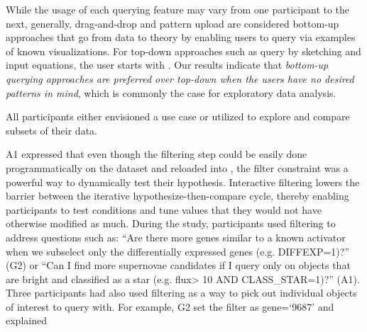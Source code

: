 \par While the usage of each querying feature may vary from one participant to the next, generally,  drag-and-drop and pattern upload are considered bottom-up approaches that go from data to theory by enabling users to query via examples of known visualizations. For top-down approaches such as query by sketching and input equations, the user starts with . Our results indicate that \emph{bottom-up querying approaches are preferred over top-down when the users have no desired patterns in mind}, which is commonly the case for exploratory data analysis.
\par All participants either envisioned a use case or utilized  to explore and compare subsets of their data. 
\par A1 expressed that even though the filtering step could be easily done programmatically on the dataset and reloaded into \zv, the filter constraint was a powerful way to dynamically test their hypothesis. Interactive filtering lowers the barrier between the iterative hypothesize-then-compare cycle, thereby enabling participants to test conditions and tune values that they would not have otherwise modified as much.
During the study, participants used filtering to address questions such as: ``Are there more genes similar to a known activator when we subselect only the differentially expressed genes (e.g. DIFFEXP=1)?'' (G2) or ``Can I find more supernovae candidates if I query only on objects that are bright and classified as a star (e.g. flux\textgreater
10 AND CLASS\_STAR=1)?'' (A1). Three participants had also used filtering as a way to pick out individual objects of interest to query with. For example, G2 set the filter as gene=`9687' and explained 

